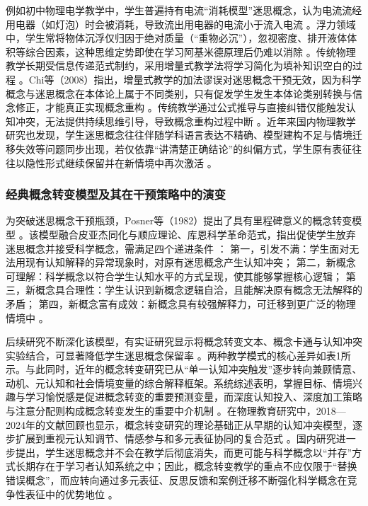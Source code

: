 例如初中物理电学教学中，学生普遍持有电流“消耗模型”迷思概念，认为电流流经用电器（如灯泡）时会被消耗，导致流出用电器的电流小于流入电流 \citep{ref4}。浮力领域中，学生常将物体沉浮仅归因于绝对质量（“重物必沉”），忽视密度、排开液体体积等综合因素，这种思维定势即使在学习阿基米德原理后仍难以消除 \citep{ref3}。传统物理教学长期受信息传递范式制约，采用增量式教学法将学习简化为填补知识空白的过程 \citep{ref6}。Chi等（2008）指出，增量式教学的加法谬误对迷思概念干预无效，因为科学概念与迷思概念在本体论上属于不同类别，只有促发学生发生本体论类别转换与信念修正，才能真正实现概念重构 \citep{ref6}。传统教学通过公式推导与直接纠错仅能触发认知冲突，无法提供持续思维引导，导致概念重构过程中断 \citep{ref6}。近年来国内物理教学研究也发现，学生迷思概念往往伴随学科语言表达不精确、模型建构不足与情境迁移失效等问题同步出现，若仅依靠“讲清楚正确结论”的纠偏方式，学生原有表征往往以隐性形式继续保留并在新情境中再次激活 \citep{lizhengde2025misconception,aryani2024conceptualchange}。

\subsubsection{经典概念转变模型及其在干预策略中的演变}

为突破迷思概念干预瓶颈，Posner等（1982）提出了具有里程碑意义的概念转变模型 \citep{ref9}。该模型融合皮亚杰同化与顺应理论、库恩科学革命范式，指出促使学生放弃迷思概念并接受科学概念，需满足四个递进条件 \citep{ref36}：
第一，引发不满：学生面对无法用现有认知解释的异常现象时，对原有迷思概念产生认知冲突；
第二，新概念可理解：科学概念以符合学生认知水平的方式呈现，使其能够掌握核心逻辑；
第三，新概念具合理性：学生认识到新概念逻辑自洽，且能解决原有概念无法解释的矛盾；
第四，新概念富有成效：新概念具有较强解释力，可迁移到更广泛的物理情境中 \citep{ref5}。

后续研究不断深化该模型，有实证研究显示将概念转变文本、概念卡通与认知冲突实验结合，可显著降低学生迷思概念保留率 \citep{ref4}。两种教学模式的核心差异如表1所示。与此同时，近年的概念转变研究已从“单一认知冲突触发”逐步转向兼顾情意、动机、元认知和社会情境变量的综合解释框架。系统综述表明，掌握目标、情境兴趣与学习愉悦感是促进概念转变的重要预测变量，而深度认知投入、深度加工策略与注意分配则构成概念转变发生的重要中介机制 \citep{olaogun2025predictors}。在物理教育研究中，2018—2024年的文献回顾也显示，概念转变研究的理论基础正从早期的认知冲突模型，逐步扩展到重视元认知调节、情感参与和多元表征协同的复合范式 \citep{aryani2024conceptualchange}。国内研究进一步提出，学生迷思概念并不会在教学后彻底消失，而更可能与科学概念以“并存”方式长期存在于学习者认知系统之中；因此，概念转变教学的重点不应仅限于“替换错误概念”，而应转向通过多元表征、反思反馈和案例迁移不断强化科学概念在竞争性表征中的优势地位 \citep{fan2024coexistence}。

